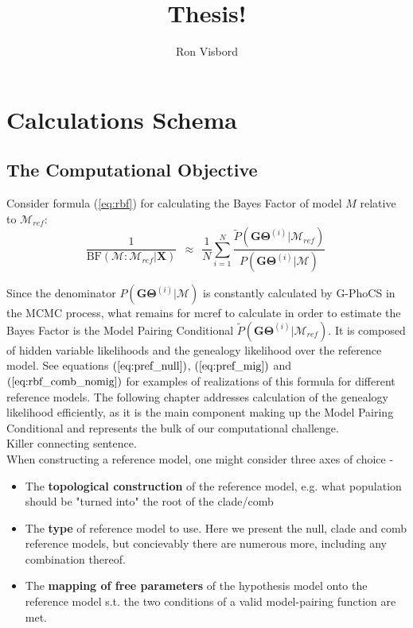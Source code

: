 \documentclass[11pt]{article}
\author{Ron Visbord}
\title{Thesis!}
\newcommand{\vect}[1]{\boldsymbol{\mathbf{#1}}}
\newcommand{\X}{\vect{X}}
\newcommand{\M}{\mathcal{M}}
\newcommand{\G}{\vect{G}}
\newcommand{\T}{\vect{\Theta}}
\newcommand{\GT}{\G\T}
\newcommand{\Mref}{\M_{ref}}
\newcommand{\Pref}{\widetilde{P}}
\newcommand{\rbf}{\text{BF}}
\newcommand{\1}{\mathbbm{1}}
\newcommand{\gp}{G-PhoCS }
\begin{document}
\maketitle


\section{Calculations Schema}


\subsection{The Computational Objective}

Consider formula (\ref{eq:rbf}) for calculating the Bayes Factor of model $M$ relative to $\Mref$:
%
%
\begin{equation}
 \frac{1}{\rbf(\M:\Mref|\X)}  ~~\approx~~ \frac{1}{N} \sum_{i=1}^{N}\frac{\Pref(\GT^{(i)}|\Mref) }{P(\GT^{(i)}|\M)} ~ 
\end{equation}

Since the denominator $P(\GT^{(i)}|\M)$ is constantly calculated by \gp in the MCMC process, what remains for mcref to calculate in order to estimate the Bayes Factor is the Model Pairing Conditional $\Pref(\GT^{(i)}|\Mref)$. It is composed of hidden variable likelihoods and the genealogy likelihood over the reference model. See equations $(\ref{eq:pref_null})$, $(\ref{eq:pref_mig})$ and $(\ref{eq:rbf_comb_nomig})$ for examples of realizations of this formula for different reference models. The following chapter addresses calculation of the genealogy likelihood efficiently, as it is the main component making up the Model Pairing Conditional and represents the bulk of our computational challenge.\\

Killer connecting sentence.\\

When constructing a reference model, one might consider three axes of choice - 
\begin{itemize}
\item The \textbf{topological construction} of the reference model, e.g. what population should be "turned into" the root of the clade/comb

\item The \textbf{type} of reference model to use. Here we present the null, clade and comb reference models, but concievably there are numerous more, including any combination thereof.

\item The \textbf{mapping of free parameters} of the hypothesis model onto the reference model s.t. the two conditions of a valid model-pairing function are met.
\end{itemize}
\end{document}
